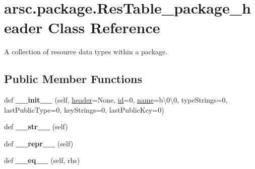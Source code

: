 \hypertarget{classarsc_1_1package_1_1ResTable__package__header}{}\section{arsc.\+package.\+Res\+Table\+\_\+package\+\_\+header Class Reference}
\label{classarsc_1_1package_1_1ResTable__package__header}


A collection of resource data types within a package.  


\subsection*{Public Member Functions}
\begin{DoxyCompactItemize}
\item 
\mbox{\label{classarsc_1_1package_1_1ResTable__package__header_ad26da044abe12865aff46d3cdc349c3a}} 
def {\bfseries \+\_\+\+\_\+init\+\_\+\+\_\+} (self, \mbox{\hyperlink{classarsc_1_1package_1_1ResTable__package__header_ab92288c84778472ad9bd44c300913f38}{header}}=None, \mbox{\hyperlink{classarsc_1_1package_1_1ResTable__package__header_ae0be8e4719350496515e7b83b3e74e38}{id}}=0, \mbox{\hyperlink{classarsc_1_1package_1_1ResTable__package__header_a9862f17d7cd35b4662c5928e01d63882}{name}}=b\textquotesingle{}\textbackslash{}0\textbackslash{}0\textquotesingle{}, type\+Strings=0, last\+Public\+Type=0, key\+Strings=0, last\+Public\+Key=0)
\item 
\mbox{\label{classarsc_1_1package_1_1ResTable__package__header_a1d0341514b673744867210173e07ce5c}} 
def {\bfseries \+\_\+\+\_\+str\+\_\+\+\_\+} (self)
\item 
\mbox{\label{classarsc_1_1package_1_1ResTable__package__header_ae8a2c57bc24a3873d30a6161395d49a7}} 
def {\bfseries \+\_\+\+\_\+repr\+\_\+\+\_\+} (self)
\item 
\mbox{\label{classarsc_1_1package_1_1ResTable__package__header_ac518de0d02ca3782e6df0af09ff5bfeb}} 
def {\bfseries \+\_\+\+\_\+eq\+\_\+\+\_\+} (self, rhs)
\item 

\end{DoxyCompactItemize}
